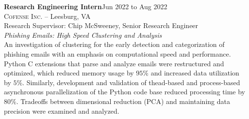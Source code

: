 \documentclass[hidelinks, 10.5pt]{article}
\def\contentwidth{0.9\linewidth}    %
\def\contentblockspacing{2.5mm}     %
\def\contentheaderspacing{1mm}      %
\begin{document}
{\begin{minipage}[ct]{\contentwidth}
    \textbf{Research Engineering Intern}\hfill Jun 2022 to Aug 2022\\
    \textsc{Cofense Inc.} -- Leesburg, VA\\
    Research Supervisor: Chip McSweeney, Senior Research Engineer
    \vspace{\contentheaderspacing}\\
    {\textit{Phishing Emails: High Speed Clustering and Analysis}}\\
    An investigation of clustering for the early detection and categorization of phishing emails with an emphasis on computational speed
    and performance.  Python C extensions that parse and analyze emails were restructured and optimized, which reduced memory usage by
    $95$\% and increased data utilization by $5$\%. Similarly, development and validation of thead-based and process-based asynchronous
    parallelization of the Python code base reduced processing time by $80$\%. Tradeoffs between dimensional reduction (PCA) and
    maintaining data precision were examined and analyzed.
\end{minipage}

\vspace{\contentblockspacing}

}
\end{document}
